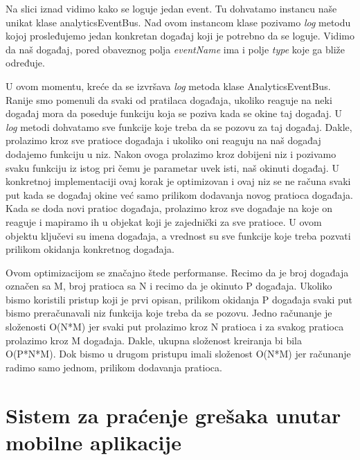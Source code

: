 \documentclass[12pt,oneside]{memoir}
\begin{document}
Na slici iznad vidimo kako se loguje jedan event. Tu dohvatamo instancu naše unikat klase analyticsEventBus. Nad ovom instancom klase pozivamo \textit{log} metodu kojoj prosleđujemo jedan konkretan događaj koji je potrebno da se loguje. Vidimo da naš događaj, pored obaveznog polja \textit{eventName} ima i polje \textit{type} koje ga bliže određuje. \newline

U ovom momentu, kreće da se izvršava \textit{log} metoda klase AnalyticsEventBus. Ranije smo pomenuli da svaki od pratilaca događaja, ukoliko reaguje na neki događaj mora da poseduje funkciju koja se poziva kada se okine taj događaj. U \textit{log} metodi dohvatamo sve funkcije koje treba da se pozovu za taj događaj. Dakle, prolazimo kroz sve pratioce događaja i ukoliko oni reaguju na naš događaj dodajemo funkciju u niz. Nakon ovoga prolazimo kroz dobijeni niz i pozivamo svaku funkciju iz istog pri čemu je parametar uvek isti, naš okinuti događaj. U konkretnoj implementaciji ovaj korak je optimizovan i ovaj niz se ne računa svaki put kada se događaj okine već samo prilikom dodavanja novog pratioca događaja. Kada se doda novi pratioc događaja, prolazimo kroz sve događaje na koje on reaguje i mapiramo ih u objekat koji je zajednički za sve pratioce. U ovom objektu ključevi su imena događaja, a vrednost su sve funkcije koje treba pozvati prilikom okidanja konkretnog događaja. \newline

Ovom optimizacijom se značajno štede performanse. Recimo da je broj događaja označen sa M, broj pratioca sa N i recimo da je okinuto P događaja. Ukoliko bismo koristili pristup koji je prvi opisan, prilikom okidanja P događaja svaki put bismo preračunavali niz funkcija koje treba da se pozovu. Jedno računanje je složenosti O(N*M) jer svaki put prolazimo kroz N pratioca i za svakog pratioca prolazimo kroz M događaja. Dakle, ukupna složenost kreiranja bi bila O(P*N*M). Dok bismo u drugom pristupu imali složenost O(N*M) jer računanje radimo samo jednom, prilikom dodavanja pratioca.

\chapter{Sistem za praćenje grešaka unutar mobilne aplikacije}
\end{document}
